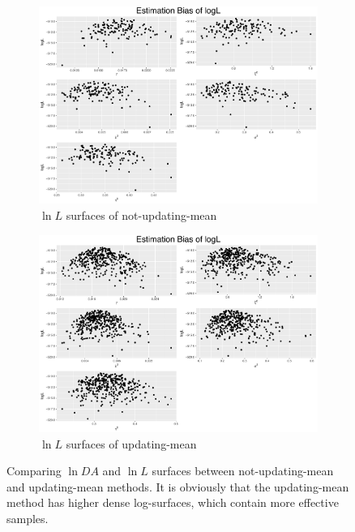 \begin{figure}[ht]
\begin{subfigure}[t]{0.45\textwidth}
	\includegraphics[width=\textwidth]{Chapters/05MCMCOU/plots/realdataestbiaslogLnoupdate.pdf}
	\caption{$\ln L$ surfaces of not-updating-mean}
\end{subfigure}
\begin{subfigure}[t]{0.45\textwidth}
	\includegraphics[width=\textwidth]{Chapters/05MCMCOU/plots/realdataestbiaslogLupdate.pdf}
	\caption{$\ln L$ surfaces of updating-mean}
\end{subfigure}
\caption{Comparing $\ln DA$ and $\ln L$ surfaces between not-updating-mean and updating-mean methods. It is obviously that the updating-mean method has higher dense log-surfaces, which contain more effective samples.} \label{comparenotanupDAL}
\end{figure}

